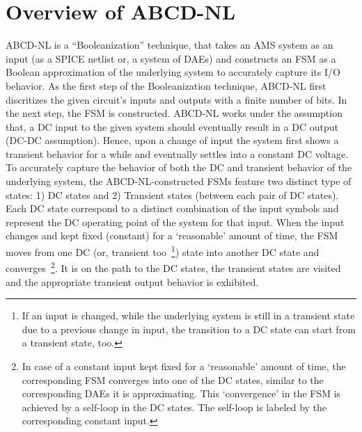 \documentclass[a4paper]{article}
\begin{document}
\section{Overview of ABCD-NL}\label{sec:overview}
ABCD-NL is a ``Booleanization'' technique, that takes an AMS system as an input (as a SPICE netlist or, a system of DAEs) and constructs an FSM as a Boolean approximation of the underlying system to accurately capture its I/O behavior. As the first step of the Booleanization technique, ABCD-NL first discritizes the given circuit’s inputs and outputs with a finite number of bits. In the next step, the FSM is constructed. ABCD-NL works under the assumption that, a DC input to the given system should eventually result in a DC output (DC-DC assumption). Hence, upon a change of input the system first shows a transient behavior for a while and eventually settles into a constant DC voltage. To accurately capture the behavior of both the DC and transient behavior of the underlying system, the ABCD-NL-constructed FSMs feature two distinct type of states:  1) DC states and 2) Transient states (between each pair of DC states). Each DC state correspond to a distinct combination of the input symbols and represent the DC operating point of the system for that input. When the input changes and kept fixed (constant) for a `reasonable' amount of time, the FSM moves from one DC (or, transient too~\footnote{If an input is changed, while the underlying system is still in a transient state due to a previous change in input, the transition to a DC state can start from a transient state, too.}) state into another DC state and converges~\footnote{In case of a constant input kept fixed for a `reasonable' amount of time, the corresponding FSM converges into one of the DC states, similar to the corresponding DAEs it is approximating. This `convergence' in the FSM is achieved by a self-loop in the DC states. The self-loop is labeled by the corresponding constant input. }. It is on the path to the DC states, the transient states are visited and the appropriate transient output behavior is exhibited. 
\end{document}

